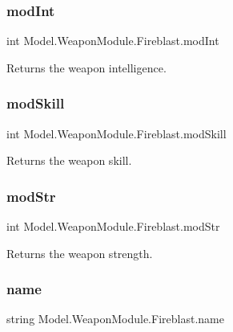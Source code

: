 \subsubsection{\texorpdfstring{mod\+Int}{modInt}}
{\footnotesize\ttfamily int Model.\+Weapon\+Module.\+Fireblast.\+mod\+Int\hspace{0.3cm}{\ttfamily [get]}}

Returns the weapon intelligence. \hypertarget{class_model_1_1_weapon_module_1_1_fireblast_a543183fac09bb809918413bb64c75087}{}\label{class_model_1_1_weapon_module_1_1_fireblast_a543183fac09bb809918413bb64c75087} 
\subsubsection{\texorpdfstring{mod\+Skill}{modSkill}}
{\footnotesize\ttfamily int Model.\+Weapon\+Module.\+Fireblast.\+mod\+Skill\hspace{0.3cm}{\ttfamily [get]}}

Returns the weapon skill. \hypertarget{class_model_1_1_weapon_module_1_1_fireblast_a1ad6c3bbb2766fa40924346f3c20008f}{}\label{class_model_1_1_weapon_module_1_1_fireblast_a1ad6c3bbb2766fa40924346f3c20008f} 
\subsubsection{\texorpdfstring{mod\+Str}{modStr}}
{\footnotesize\ttfamily int Model.\+Weapon\+Module.\+Fireblast.\+mod\+Str\hspace{0.3cm}{\ttfamily [get]}}

Returns the weapon strength. \hypertarget{class_model_1_1_weapon_module_1_1_fireblast_a842a73ba66f7451a745ed25e770c12bd}{}\label{class_model_1_1_weapon_module_1_1_fireblast_a842a73ba66f7451a745ed25e770c12bd} 
\subsubsection{\texorpdfstring{name}{name}}
{\footnotesize\ttfamily string Model.\+Weapon\+Module.\+Fireblast.\+name\hspace{0.3cm}{\ttfamily [get]}}

